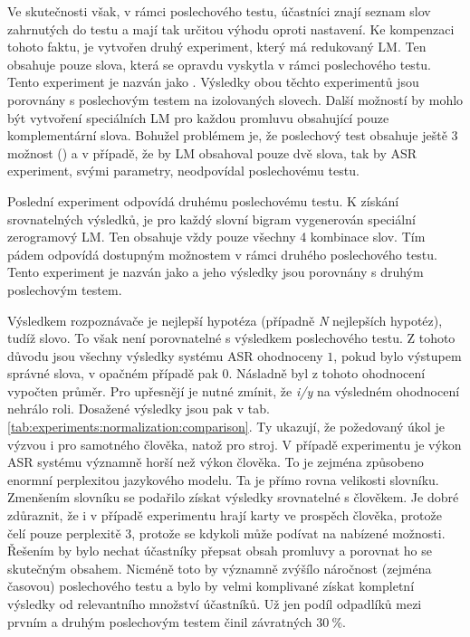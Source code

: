 Ve skutečnosti však, v rámci poslechového testu, účastníci znají seznam slov zahrnutých do testu a mají tak určitou výhodu oproti  nastavení. Ke kompenzaci tohoto faktu, je vytvořen druhý experiment, který má redukovaný LM. Ten obsahuje pouze slova, která se opravdu vyskytla v rámci poslechového testu. Tento experiment je nazván jako . Výsledky obou těchto experimentů jsou porovnány s poslechovým testem na izolovaných slovech. Další možností by mohlo být vytvoření speciálních LM pro každou promluvu obsahující pouze komplementární slova. Bohužel problémem je, že poslechový test obsahuje ještě 3 možnost () a v případě, že by LM obsahoval pouze dvě slova, tak by ASR experiment, svými parametry, neodpovídal poslechovému testu.

Poslední experiment odpovídá druhému poslechovému testu. K získání srovnatelných výsledků, je pro každý slovní bigram vygenerován speciální zerogramový LM. Ten obsahuje vždy pouze všechny 4 kombinace slov. Tím pádem odpovídá dostupným možnostem v rámci druhého poslechového testu. Tento experiment je nazván jako  a jeho výsledky jsou porovnány s druhým poslechovým testem.

Výsledkem rozpoznávače je nejlepší hypotéza (případně \textit{N} nejlepších hypotéz), tudíž slovo. To však není porovnatelné s výsledkem poslechového testu. Z tohoto důvodu jsou všechny výsledky systému ASR ohodnoceny $1$, pokud bylo výstupem správné slova, v opačném případě pak $0$. Násladně byl z tohoto ohodnocení vypočten průměr. Pro upřesnějí je nutné zmínit, že \textit{i/y} na výsledném ohodnocení nehrálo roli. Dosažené výsledky jsou pak v tab. \ref{tab:experiments:normalization:comparison}. Ty ukazují, že požedovaný úkol je výzvou i pro samotného člověka, natož pro stroj. V případě experimentu  je výkon ASR systému významně horší než výkon člověka. To je zejména způsobeno enormní perplexitou jazykového modelu. Ta je přímo rovna velikosti slovníku. Zmenšením slovníku se podařilo získat výsledky srovnatelné s člověkem. Je dobré zdůraznit, že i v případě  experimentu hrají karty ve prospěch člověka, protože čelí pouze perplexitě $3$, protože se kdykoli může podívat na nabízené možnosti. Řešením by bylo nechat účastníky přepsat obsah promluvy a porovnat ho se skutečným obsahem. Nicméně toto by významně zvýšílo náročnost (zejména časovou) poslechového testu a bylo by velmi komplivané získat kompletní výsledky od relevantního množství účastníků. Už jen podíl odpadlíků mezi prvním a druhým poslechovým testem činil závratných $30\ \%$.

